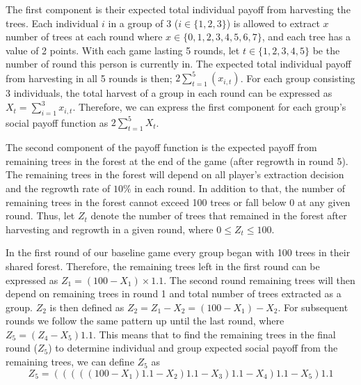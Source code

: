  The first component is their expected total individual payoff from harvesting the trees. Each individual $i$ in a group of 3 ($i \in \{1,2,3\}$) is allowed to extract $x$ number of trees at each round where $x \in \{0,1,2,3,4,5,6,7\}$, and each tree has a value of 2 points. With each game lasting 5 rounds, let $t\in \{1,2,3,4,5\}$ be the number of round this person is currently in. The expected total individual payoff from harvesting in all 5 rounds is then; $2\sum_{t=1}^{5}(x_{i,t})$. For each group consisting 3 individuals, the total harvest of a group in each round can be expressed as $X_{t} = \sum_{i=1}^{3} x_{i,t} $. Therefore, we can express the first component for each group's social payoff function as $2 \sum_{t=1}^{5} X_{t}$.

 The second component of the payoff function is the expected payoff from remaining trees in the forest at the end of the game (after regrowth in round 5). The remaining trees in the forest will depend on all player's extraction decision and the regrowth rate of $10\%$ in each round. In addition to that, the number of remaining trees in the forest cannot exceed 100 trees or fall below 0 at any given round. Thus, let $Z_t$ denote the number of trees that remained in the forest after harvesting and regrowth in a given round, where $0\leq Z_t \leq100$.

 In the first round of our baseline game every group began with 100 trees in their shared forest. Therefore, the remaining trees left in the first round can be expressed as $Z_{1}=(100-X_{1}) \times 1.1$. The second round remaining trees will then depend on remaining trees in round 1 and total number of trees extracted as a group. $Z_{2}$ is then defined as $Z_{2} = Z_{1} - X_{2} = (100-X_{1}) - X_{2}$. For subsequent rounds we follow the same pattern up until the last round, where $Z_5 = (Z_4 - X_5) 1.1$. This means that to find the remaining trees in the final round ($Z_5$) to determine individual and group expected social payoff from the remaining trees, we can define $Z_{5}$ as
\begin{equation}
\label{eq:1}
      Z_{5} = \left( \left( \left( \left( \left(100 - X_{1}\right) 1.1 - X_{2}\right) 1.1 - X_{3} \right) 1.1 - X_{4} \right) 1.1 - X_{5} \right) 1.1
\end{equation}

